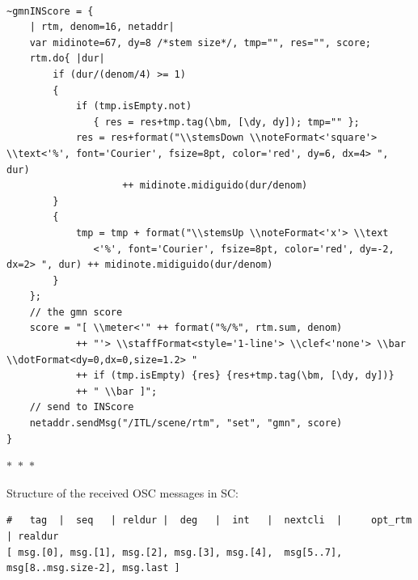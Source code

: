 \documentclass{article}
\begin{document}
\begin{lstlisting}[style=SuperCollider-IDE]

~gmnINScore = {
    | rtm, denom=16, netaddr|
    var midinote=67, dy=8 /*stem size*/, tmp="", res="", score;
    rtm.do{ |dur|
        if (dur/(denom/4) >= 1)
        {
            if (tmp.isEmpty.not) 
               { res = res+tmp.tag(\bm, [\dy, dy]); tmp="" };
            res = res+format("\\stemsDown \\noteFormat<'square'> \\text<'%', font='Courier', fsize=8pt, color='red', dy=6, dx=4> ", dur) 
                    ++ midinote.midiguido(dur/denom)
        }
        {
            tmp = tmp + format("\\stemsUp \\noteFormat<'x'> \\text
               <'%', font='Courier', fsize=8pt, color='red', dy=-2, dx=2> ", dur) ++ midinote.midiguido(dur/denom)
        }
    };     
    // the gmn score
    score = "[ \\meter<'" ++ format("%/%", rtm.sum, denom) 
            ++ "'> \\staffFormat<style='1-line'> \\clef<'none'> \\bar \\dotFormat<dy=0,dx=0,size=1.2> " 
            ++ if (tmp.isEmpty) {res} {res+tmp.tag(\bm, [\dy, dy])} 
            ++ " \\bar ]";
    // send to INScore
    netaddr.sendMsg("/ITL/scene/rtm", "set", "gmn", score)
}
\end{lstlisting}

\begin{center}
  $\ast$~$\ast$~$\ast$
\end{center}

\noindent Structure of the received OSC messages in SC:
\begin{lstlisting}[language=inscore,  basicstyle=\ttfamily\ssmall]
#   tag  |  seq   | reldur |  deg   |  int   |  nextcli  |     opt_rtm       | realdur
[ msg.[0], msg.[1], msg.[2], msg.[3], msg.[4],  msg[5..7], msg[8..msg.size-2], msg.last ]
\end{lstlisting}
\end{document}
